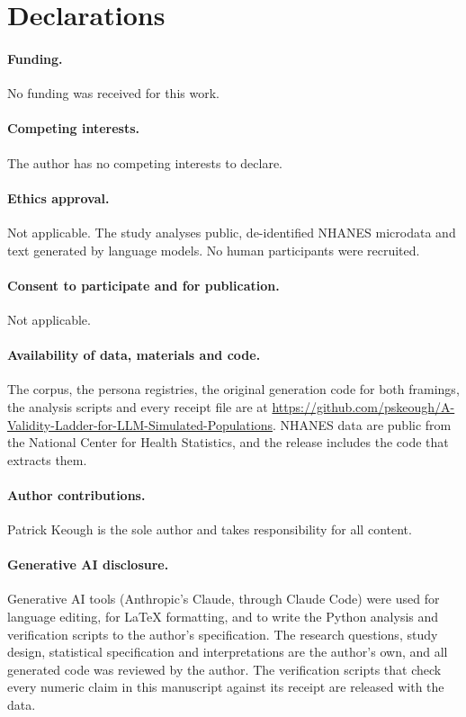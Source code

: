 
\section*{Declarations}

\paragraph{Funding.} No funding was received for this work.

\paragraph{Competing interests.} The author has no competing interests to declare.

\paragraph{Ethics approval.} Not applicable. The study analyses public, de-identified NHANES microdata and text generated by language models. No human participants were recruited.

\paragraph{Consent to participate and for publication.} Not applicable.

\paragraph{Availability of data, materials and code.} The corpus, the persona registries, the original generation code for both framings, the analysis scripts and every receipt file are at \url{https://github.com/pskeough/A-Validity-Ladder-for-LLM-Simulated-Populations}. NHANES data are public from the National Center for Health Statistics, and the release includes the code that extracts them.

\paragraph{Author contributions.} Patrick Keough is the sole author and takes responsibility for all content.

\paragraph{Generative AI disclosure.} Generative AI tools (Anthropic's Claude, through Claude Code) were used for language editing, for LaTeX formatting, and to write the Python analysis and verification scripts to the author's specification. The research questions, study design, statistical specification and interpretations are the author's own, and all generated code was reviewed by the author. The verification scripts that check every numeric claim in this manuscript against its receipt are released with the data.

